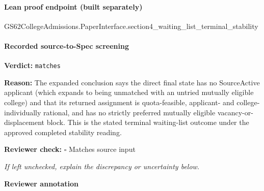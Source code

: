 \documentclass[10pt]{article}
\newcommand{\reviewerbox}{%
  \par\noindent\fbox{\parbox{0.96\linewidth}{\rule{0pt}{0.38in}}}\par
}
\newcommand{\reviewmatch}[1]{%
  \par\noindent\textbf{Reviewer check:} $\square$\; #1\par
  \noindent\emph{If left unchecked, explain the discrepancy or uncertainty below.}\par
}
\begin{document}
\paragraph{Lean proof endpoint (built separately)}\begin{ReviewVerbatim}
GS62CollegeAdmissions.PaperInterface.section4_waiting_list_terminal_stability
\end{ReviewVerbatim}

\paragraph{Recorded source-to-Spec screening}
\textbf{Verdict:} \texttt{matches}
\\
{\raggedright
\textbf{Reason:} The expanded conclusion says the direct final state has no SourceActive applicant (which expands to being unmatched with an untried mutually eligible college) and that its returned assignment is quota-\allowbreak{}feasible, applicant-\allowbreak{} and college-\allowbreak{}individually rational, and has no strictly preferred mutually eligible vacancy-\allowbreak{}or-\allowbreak{}displacement block.\allowbreak{} This is the stated terminal waiting-\allowbreak{}list outcome under the approved completed stability reading.\allowbreak{}
\par}
\reviewmatch{Matches source input}
\noindent\textbf{Reviewer annotation}\par
\reviewerbox
\end{document}
